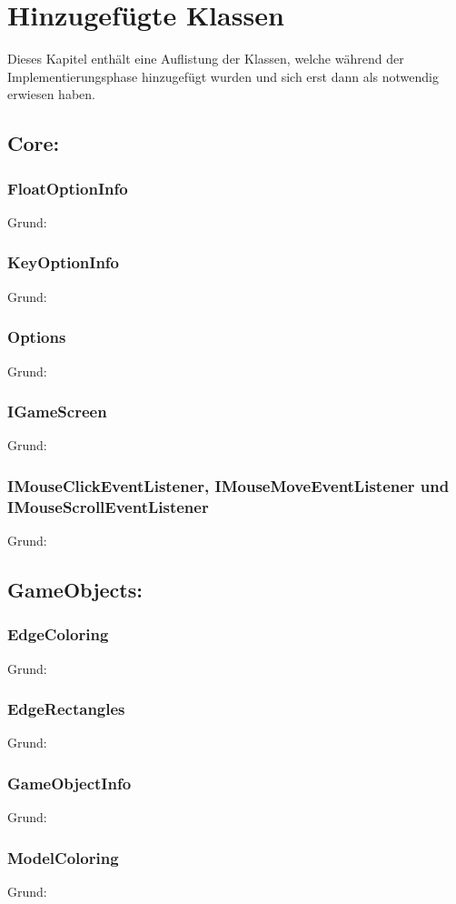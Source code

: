 \chapter{Hinzugefügte Klassen}
Dieses Kapitel enthält eine Auflistung der Klassen, welche während der Implementierungsphase hinzugefügt wurden und sich erst dann als notwendig erwiesen haben.

\section{Core:}
\subsection{FloatOptionInfo}
Grund:
\subsection{KeyOptionInfo}
Grund:
\subsection{Options}
Grund:
\subsection{IGameScreen}
Grund:
\subsection{IMouseClickEventListener, IMouseMoveEventListener und IMouseScrollEventListener}
Grund:

\section{GameObjects:}
\subsection{EdgeColoring}
Grund:
\subsection{EdgeRectangles}
Grund:
\subsection{GameObjectInfo}
Grund:
\subsection{ModelColoring}
Grund:
